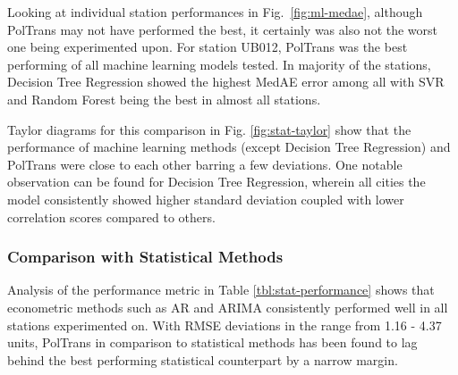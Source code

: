 \documentclass[twocolumn]{svjour3}          %
\begin{document}
Looking at individual station performances in Fig.~\ref{fig:ml-medae}, although {PolTrans} may not have performed the best, it certainly was also not the worst one being experimented upon. For station UB012, {PolTrans} was the best performing of all machine learning models tested. In majority of the stations, Decision Tree Regression showed the highest MedAE error among all with SVR and Random Forest being the best in almost all stations.

Taylor diagrams for this comparison in Fig. \ref{fig:stat-taylor} show that the performance of machine learning methods (except Decision Tree Regression) and {PolTrans} were close to each other barring a few deviations. One notable observation can be found for Decision Tree Regression, wherein all cities the model consistently showed higher standard deviation coupled with lower correlation scores compared to others.

\subsubsection{Comparison with Statistical Methods}

Analysis of the performance metric in Table \ref{tbl:stat-performance} shows that econometric methods such as AR and ARIMA consistently performed well in all stations experimented on. With RMSE deviations in the range from 1.16 - 4.37 units, {PolTrans} in comparison to statistical methods has been found to lag behind the best performing statistical counterpart by a narrow margin.
\end{document}
